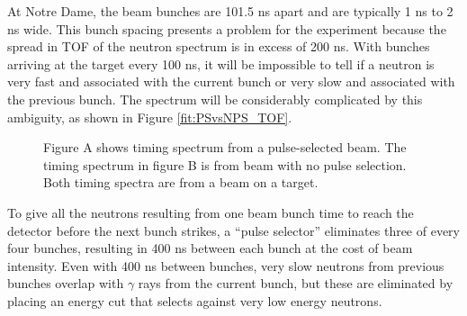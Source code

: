 
At Notre Dame, the beam bunches are 101.5 ns apart and are typically 1 ns to 2 ns wide.  This bunch spacing presents a problem for the experiment because the spread in TOF of the neutron spectrum is in excess of 200 ns.  With bunches arriving at the target every 100 ns, it will be impossible to tell if a neutron is very fast and associated with the current bunch or very slow and associated with the previous bunch.  The spectrum will be considerably complicated by this ambiguity, as shown in Figure \ref{fit:PSvsNPS_TOF}.

\begin{figure}[htp]
\centering
{}
\label{fig:PSvsNPS_TOF}
\caption{Figure A shows timing spectrum from a pulse-selected beam.  The timing spectrum in figure B is from beam with no pulse selection.  Both timing spectra are from a  beam on a  target.}
\end{figure}

To give all the neutrons resulting from one beam bunch time to reach the detector before the next bunch strikes, a ``pulse selector'' eliminates three of every four bunches, resulting in 400 ns between each bunch at the cost of beam intensity.  Even with 400 ns between bunches, very slow neutrons from previous bunches overlap with $\gamma$ rays from the current bunch, but these are eliminated by placing an energy cut that selects against very low energy neutrons.


